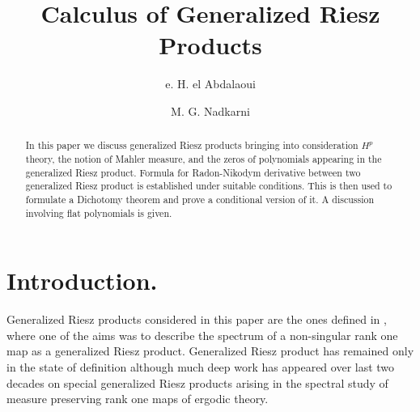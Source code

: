 \documentclass{amsart}
\theoremstyle{definition}
\theoremstyle{remark}
\numberwithin{equation}{section}
\newcommand{\1}{\mathbb{1}}
\begin{document}
\title{Calculus of Generalized Riesz Products}

\author{e. H. el Abdalaoui}
\address{Normandie University, University of Rouen
  Department of Mathematics, LMRS  UMR 60 85 CNRS\\
Avenue de l'Universit\'e, BP.12
76801 Saint Etienne du Rouvray - France .}
\author{M. G. Nadkarni}
\address{Department of Mathematics, University of Mumbai, Vidyanagari, Kalina,  Mumbai, 400098, India}


\dedicatory{}


\begin{abstract}
In this paper we discuss generalized Riesz products bringing into consideration $H^p$ theory, the notion of Mahler measure, and the zeros of polynomials appearing in the generalized Riesz product. Formula for Radon-Nikodym derivative between two generalized Riesz product is established under suitable conditions. This is then used to formulate a Dichotomy theorem and prove a conditional version of it. A discussion involving flat polynomials is given.
\end{abstract}

\maketitle

\section{Introduction.}
 Generalized Riesz products considered in this paper are the ones defined in \cite{Host-Mela-Parreau},\cite{Nadkarni1} where one of the  aims was to describe the spectrum of a non-singular rank one map as a generalized Riesz product. Generalized Riesz product has  remained only in the state of definition although much deep work has appeared over last two decades on special generalized Riesz products arising in the spectral study of measure preserving rank one maps of ergodic theory.\\
\end{document}
